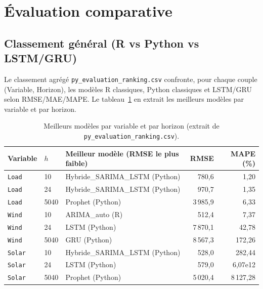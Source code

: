 \section{Évaluation comparative}
\label{sec:evaluation}

\subsection{Classement général (R vs Python vs LSTM/GRU)}
Le classement agrégé \texttt{py\_evaluation\_ranking.csv} confronte, pour
chaque couple (Variable, Horizon), les modèles R classiques, Python classiques
et LSTM/GRU selon RMSE/MAE/MAPE. Le tableau~\ref{tab:ranking_top} en extrait
les meilleurs modèles par variable et par horizon.

\begin{table}[H]
\centering
\caption{Meilleurs modèles par variable et par horizon (extrait de
\texttt{py\_evaluation\_ranking.csv}).}
\label{tab:ranking_top}
\small
\begin{tabular}{lllrr}
\toprule
Variable & $h$ & Meilleur modèle (RMSE le plus faible) & RMSE & MAPE (\%) \\
\midrule
\texttt{Load}  & 10   & Hybride\_SARIMA\_LSTM (Python) & 780{,}6 & 1{,}20 \\
\texttt{Load}  & 24   & Hybride\_SARIMA\_LSTM (Python) & 970{,}7 & 1{,}35 \\
\texttt{Load}  & 5040 & Prophet (Python)              & 3\,985{,}9 & 6{,}33 \\
\texttt{Wind}  & 10   & ARIMA\_auto (R)               & 512{,}4  & 7{,}37 \\
\texttt{Wind}  & 24   & LSTM (Python)                 & 7\,870{,}1 & 42{,}78 \\
\texttt{Wind}  & 5040 & GRU (Python)                  & 8\,567{,}3 & 172{,}26 \\
\texttt{Solar} & 10   & Hybride\_SARIMA\_LSTM (Python) & 528{,}0  & 282{,}44 \\
\texttt{Solar} & 24   & LSTM (Python)                 & 579{,}0  & 6{,}07e12 \\
\texttt{Solar} & 5040 & Prophet (Python)              & 5\,020{,}4 & 8\,127{,}28 \\
\bottomrule
\end{tabular}
\end{table}

